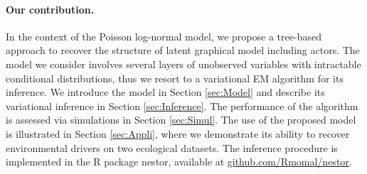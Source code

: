 \paragraph{Our contribution.}
In the context of the Poisson log-normal model, we propose  a tree-based approach to recover the structure of latent graphical model including actors. The model we consider involves several layers of unobserved variables with intractable conditional distributions, thus we resort to a variational EM algorithm \citep{BKM17} for its inference. We introduce the model in Section \ref{sec:Model} and describe its variational inference in Section \ref{sec:Inference}. The performance of the algorithm is assessed via simulations in Section \ref{sec:Simul}. The use of the proposed model is illustrated in Section \ref{sec:Appli}, where we demonstrate its ability to recover environmental drivers on two ecological datasets. The inference procedure is implemented in the R package nestor, available at \url{github.com/Rmomal/nestor}.


  


